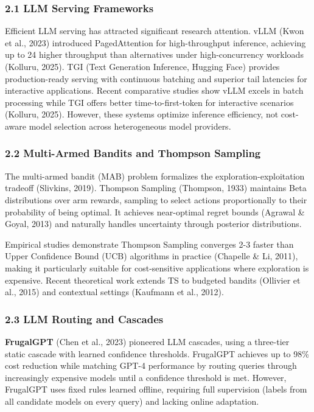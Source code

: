 \hypertarget{llm-serving-frameworks}{%
\subsubsection{2.1 LLM Serving
Frameworks}\label{llm-serving-frameworks}}

Efficient LLM serving has attracted significant research attention. vLLM
(Kwon et al., 2023) introduced PagedAttention for high-throughput
inference, achieving up to 24 higher throughput than alternatives under
high-concurrency workloads (Kolluru, 2025). TGI (Text Generation
Inference, Hugging Face) provides production-ready serving with
continuous batching and superior tail latencies for interactive
applications. Recent comparative studies show vLLM excels in batch
processing while TGI offers better time-to-first-token for interactive
scenarios (Kolluru, 2025). However, these systems optimize inference
efficiency, not cost-aware model selection across heterogeneous model
providers.

\hypertarget{multi-armed-bandits-and-thompson-sampling}{%
\subsubsection{2.2 Multi-Armed Bandits and Thompson
Sampling}\label{multi-armed-bandits-and-thompson-sampling}}

The multi-armed bandit (MAB) problem formalizes the
exploration-exploitation tradeoff (Slivkins, 2019). Thompson Sampling
(Thompson, 1933) maintains Beta distributions over arm rewards, sampling
to select actions proportionally to their probability of being optimal.
It achieves near-optimal regret bounds (Agrawal \& Goyal, 2013) and
naturally handles uncertainty through posterior distributions.

Empirical studies demonstrate Thompson Sampling converges 2-3 faster
than Upper Confidence Bound (UCB) algorithms in practice (Chapelle \&
Li, 2011), making it particularly suitable for cost-sensitive
applications where exploration is expensive. Recent theoretical work
extends TS to budgeted bandits (Ollivier et al., 2015) and contextual
settings (Kaufmann et al., 2012).

\hypertarget{llm-routing-and-cascades}{%
\subsubsection{2.3 LLM Routing and
Cascades}\label{llm-routing-and-cascades}}

\textbf{FrugalGPT} (Chen et al., 2023) pioneered LLM cascades, using a
three-tier static cascade with learned confidence thresholds. FrugalGPT
achieves up to 98\% cost reduction while matching GPT-4 performance by
routing queries through increasingly expensive models until a confidence
threshold is met. However, FrugalGPT uses fixed rules learned offline,
requiring full supervision (labels from all candidate models on every
query) and lacking online adaptation.

